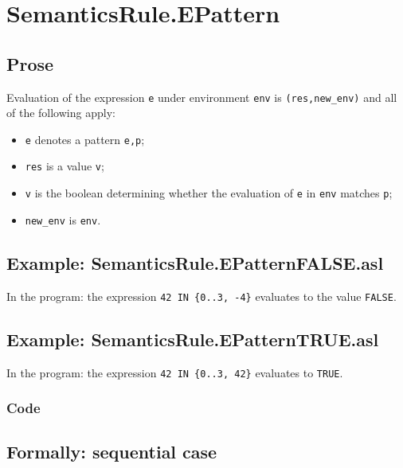 \documentclass{book}
\begin{document}
\section{SemanticsRule.EPattern \label{sec:SemanticsRule.EPattern}}


  \subsection{Prose}
  Evaluation of the expression \texttt{e} under environment \texttt{env} is
  \texttt{(res,new\_env)} and all of the following apply:
  \begin{itemize}
  \item \texttt{e} denotes a pattern \texttt{e,p};
  \item \texttt{res} is a value \texttt{v};
  \item \texttt{v} is the boolean determining whether the evaluation of \texttt{e} in \texttt{env} matches \texttt{p};
  \item \texttt{new\_env} is \texttt{env}.
  \end{itemize}

  \subsection{Example: SemanticsRule.EPatternFALSE.asl}
    In the program:
    the expression \texttt{42 IN \{0..3, -4\}} evaluates to the value \texttt{FALSE}.

  \subsection{Example: SemanticsRule.EPatternTRUE.asl}
    In the program:
    the expression \texttt{42 IN \{0..3, 42\}} evaluates to \texttt{TRUE}.

  \subsubsection{Code}

  \subsection{Formally: sequential case}
  \begin{align}
  \end{align} 
\end{document}
